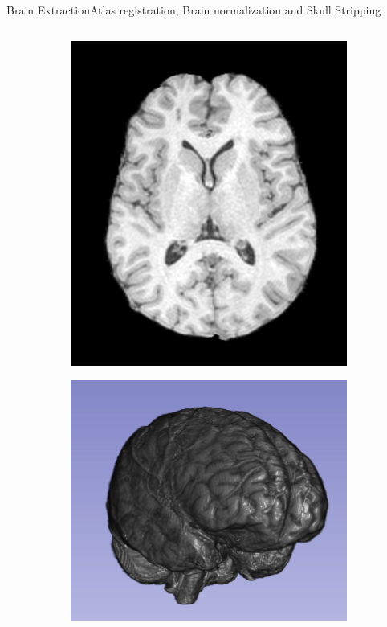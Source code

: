 \documentclass[]{standalone}
\begin{document}
\begin{frame}{Brain Extraction}{Atlas registration, Brain normalization and Skull Stripping}
\begin{columns}
\begin{column}{0.55\textwidth}
\begin{figure}[h!]
\begin{subfigure}{0.45\textwidth}
				\end{subfigure}
				\hfill
				\begin{subfigure}{0.45\textwidth}
					\centering
					\includegraphics[scale=0.05]{./IMG/brain.jpg}
				\end{subfigure}
				\begin{subfigure}{0.99\textwidth}
					\centering
					\includegraphics[scale=0.1]{./IMG/3Dbrain.jpg}
				\end{subfigure}
			\end{figure}
			\end{column}
		\end{columns}
	\end{frame}
\end{document}
